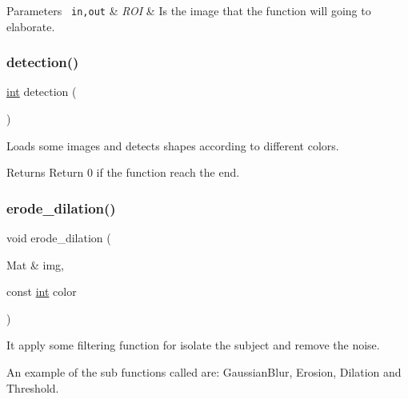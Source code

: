 \begin{DoxyParams}[1]{Parameters}
\mbox{\texttt{ in,out}}  & {\em R\+OI} & Is the image that the function will going to elaborate. \\
\hline
\end{DoxyParams}
\mbox{\label{detection_8hh_a17e13c447692201697b084a1906cf6fb}} 
\subsubsection{\texorpdfstring{detection()}{detection()}}
{\footnotesize\ttfamily \mbox{\hyperlink{draw_8hh_aa620a13339ac3a1177c86edc549fda9b}{int}} detection (\begin{DoxyParamCaption}{ }\end{DoxyParamCaption})}



Loads some images and detects shapes according to different colors. 

\begin{DoxyReturn}{Returns}
Return 0 if the function reach the end. 
\end{DoxyReturn}
\mbox{\label{detection_8hh_a28d0cdb56cfb2164f939dc2f83d1d9d0}} 
\subsubsection{\texorpdfstring{erode\_dilation()}{erode\_dilation()}}
{\footnotesize\ttfamily void erode\+\_\+dilation (\begin{DoxyParamCaption}\item[{Mat \&}]{img,  }\item[{const \mbox{\hyperlink{draw_8hh_aa620a13339ac3a1177c86edc549fda9b}{int}}}]{color }\end{DoxyParamCaption})}



It apply some filtering function for isolate the subject and remove the noise. 

An example of the sub functions called are\+: Gaussian\+Blur, Erosion, Dilation and Threshold.



